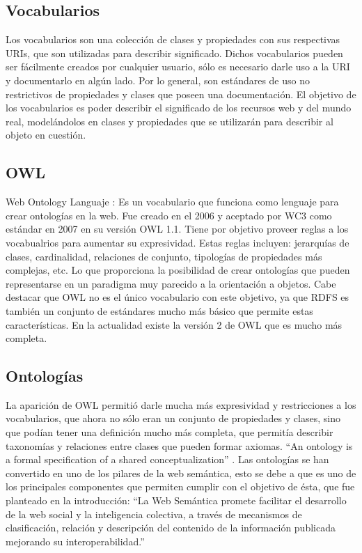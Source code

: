 \subsection{Vocabularios}

Los vocabularios son una colección de clases y propiedades con sus respectivas URIs, que son utilizadas para describir significado. Dichos vocabularios 
pueden ser fácilmente creados por cualquier usuario, sólo es necesario darle uso a la URI y documentarlo en algún lado. 
Por lo general, son estándares de uso no restrictivos de propiedades y clases que poseen una documentación.
El objetivo de los vocabularios es poder describir el significado de los recursos web y del mundo real, modelándolos en clases y 
propiedades que se utilizarán para describir al objeto en cuestión.

\subsection{OWL}


Web Ontology Languaje \cite{McGuinness2004}: Es un vocabulario que funciona como lenguaje para crear ontologías en la web. Fue creado en el 2006 y aceptado 
por WC3 como estándar en 2007 en su versión OWL 1.1. Tiene por objetivo proveer reglas a los vocabualrios para aumentar su expresividad. 
Estas reglas incluyen: jerarquías de clases, cardinalidad, relaciones de conjunto, tipologías de propiedades más complejas, etc. Lo que proporciona la posibilidad de crear ontologías que pueden 
representarse en un paradigma muy parecido a la orientación a objetos. Cabe destacar que OWL no es el único vocabulario con este objetivo, ya que RDFS 
es también un conjunto de estándares mucho más básico que permite estas características.
En la actualidad existe la versión 2 de OWL \cite{W3C} que es mucho más completa.

\subsection{Ontologías}

La aparición de OWL permitió darle mucha más expresividad y restricciones a los vocabularios, que ahora no sólo eran un conjunto de 
propiedades y clases, sino que podían tener una definición mucho más completa, que permitía describir taxonomías y relaciones entre clases que pueden formar axiomas.
``An ontology is a formal specification of a shared conceptualization'' \cite{Gruber1993} .
Las ontologías se han convertido en uno de los pilares de la web semántica, esto se debe a que es uno de los principales componentes que permiten 
cumplir con el objetivo de ésta, que fue planteado en la introducción: ``La Web Semántica promete facilitar el desarrollo de la web social y la inteligencia colectiva, a través de mecanismos de clasificación, relación y descripción del contenido de la información publicada mejorando su interoperabilidad.''

